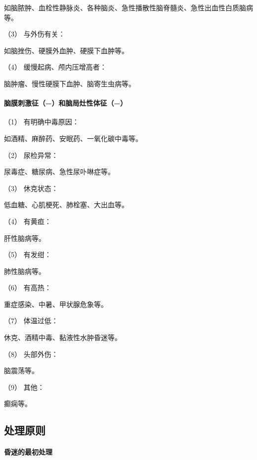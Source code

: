 如脑脓肿、血栓性静脉炎、各种脑炎、急性播散性脑脊髓炎、急性出血性白质脑病等。

\hypertarget{text00010.htmlux5cux23CHP1-2-2-4-2-2-3}{}
（3） 与外伤有关：

如脑挫伤、硬膜外血肿、硬膜下血肿等。

\hypertarget{text00010.htmlux5cux23CHP1-2-2-4-2-2-4}{}
（4） 缓慢起病、颅内压增高者：

脑肿瘤、慢性硬膜下血肿、脑寄生虫病等。

\paragraph{脑膜刺激征（−）和脑局灶性体征（−）}

\hypertarget{text00010.htmlux5cux23CHP1-2-2-4-2-3-1}{}
（1） 有明确中毒原因：

如酒精、麻醉药、安眠药、一氧化碳中毒等。

\hypertarget{text00010.htmlux5cux23CHP1-2-2-4-2-3-2}{}
（2） 尿检异常：

尿毒症、糖尿病、急性尿卟啉症等。

\hypertarget{text00010.htmlux5cux23CHP1-2-2-4-2-3-3}{}
（3） 休克状态：

低血糖、心肌梗死、肺栓塞、大出血等。

\hypertarget{text00010.htmlux5cux23CHP1-2-2-4-2-3-4}{}
（4） 有黄疸：

肝性脑病等。

\hypertarget{text00010.htmlux5cux23CHP1-2-2-4-2-3-5}{}
（5） 有发绀：

肺性脑病等。

\hypertarget{text00010.htmlux5cux23CHP1-2-2-4-2-3-6}{}
（6） 有高热：

重症感染、中暑、甲状腺危象等。

\hypertarget{text00010.htmlux5cux23CHP1-2-2-4-2-3-7}{}
（7） 体温过低：

休克、酒精中毒、黏液性水肿昏迷等。

\hypertarget{text00010.htmlux5cux23CHP1-2-2-4-2-3-8}{}
（8） 头部外伤：

脑震荡等。

\hypertarget{text00010.htmlux5cux23CHP1-2-2-4-2-3-9}{}
（9） 其他：

癫痫等。

\subsection{处理原则}

\paragraph{昏迷的最初处理}

